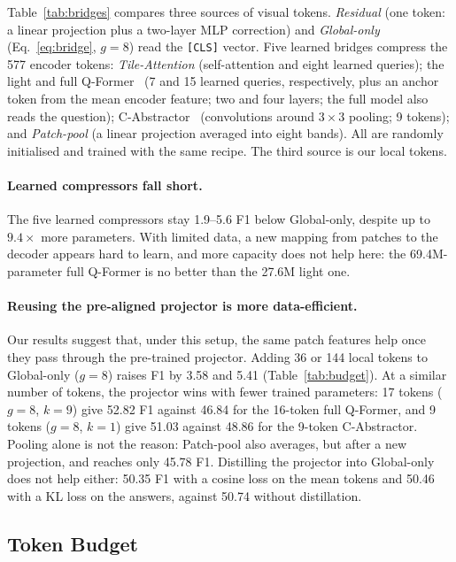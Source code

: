 Table~\ref{tab:bridges} compares three sources of visual tokens. \emph{Residual} (one token: a
linear projection plus a two-layer MLP correction) and \emph{Global-only}
(Eq.~\eqref{eq:bridge}, $g=8$) read the \texttt{[CLS]} vector. Five learned bridges compress the
577 encoder tokens: \emph{Tile-Attention} (self-attention and eight learned queries); the light
and full Q-Former~\cite{li2023blip2} (7 and 15 learned queries, respectively, plus an anchor token
from the mean encoder feature; two and four layers; the full model also reads the question);
C-Abstractor~\cite{cha2024honeybee} (convolutions around $3\times3$ pooling; 9 tokens); and
\emph{Patch-pool} (a linear projection averaged into eight bands). All are randomly initialised and
trained with the same recipe. The third source is our local tokens.

\paragraph{Learned compressors fall short.}
The five learned compressors stay 1.9--5.6 F1 below Global-only, despite up to $9.4\times$ more
parameters. With limited data, a new mapping from patches to the decoder appears hard to learn, and
more capacity does not help here: the 69.4M-parameter full Q-Former is no better than the 27.6M light
one.

\paragraph{Reusing the pre-aligned projector is more data-efficient.}
Our results suggest that, under this setup, the same patch features help once they pass through
the pre-trained projector. Adding 36 or 144
local tokens to Global-only ($g=8$) raises F1 by 3.58 and 5.41 (Table~\ref{tab:budget}). At a
similar number of tokens, the projector wins with fewer trained parameters: 17 tokens ($g=8$,
$k=9$) give 52.82 F1 against 46.84 for the 16-token full Q-Former, and 9 tokens ($g=8$, $k=1$) give
51.03 against 48.86 for the 9-token C-Abstractor. Pooling alone is not the reason: Patch-pool
also averages, but after a new projection, and reaches only 45.78 F1.
Distilling the projector into Global-only does not help either: 50.35 F1 with a cosine loss on the
mean tokens and 50.46 with a KL loss on the answers, against 50.74 without distillation.

\subsection{Token Budget}
\label{sec:budget-results}

